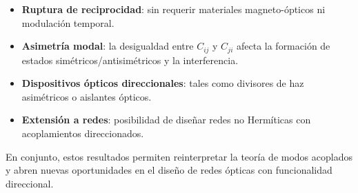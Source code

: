 \begin{itemize}
	\item \textbf{Ruptura de reciprocidad}: sin requerir materiales magneto-ópticos ni modulación temporal.
	\item \textbf{Asimetría modal}: la desigualdad entre \( C_{ij} \) y \( C_{ji} \) afecta la formación de estados simétricos/antisimétricos y la interferencia.
	\item \textbf{Dispositivos ópticos direccionales}: tales como divisores de haz asimétricos o aislantes ópticos.
	\item \textbf{Extensión a redes}: posibilidad de diseñar redes no Hermíticas con acoplamientos direccionados.
\end{itemize}

En conjunto, estos resultados permiten reinterpretar la teoría de modos acoplados y abren nuevas oportunidades en el diseño de redes ópticas con funcionalidad direccional.

